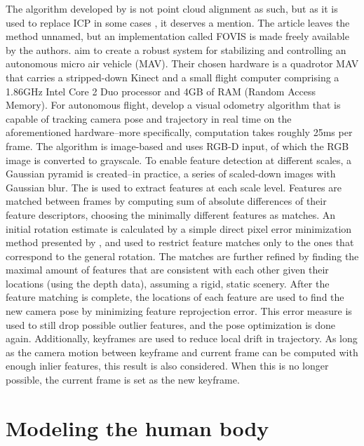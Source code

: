 The algorithm developed by \citet{huang2011visual} is not point cloud alignment as such, but as it is used to replace ICP in some cases \citep{Whelan12rssw}, it deserves a mention. The article leaves the method unnamed, but an implementation called FOVIS \citep{fovis} is made freely available by the authors. \citet{huang2011visual} aim to create a robust system for stabilizing and controlling an autonomous micro air vehicle (MAV). Their chosen hardware is a quadrotor MAV that carries a stripped-down Kinect and a small flight computer comprising a 1.86GHz Intel Core 2 Duo processor and 4GB of RAM (Random Access Memory). For autonomous flight, \citeauthor{huang2011visual} develop a visual odometry algorithm that is capable of tracking camera pose and trajectory in real time on the aforementioned hardware--more specifically, computation takes roughly 25ms per frame. The algorithm is image-based and uses RGB-D input, of which the RGB image is converted to grayscale. To enable feature detection at different scales, a Gaussian pyramid is created--in practice, a series of scaled-down images with Gaussian blur. The  is used to extract features at each scale level. Features are matched between frames by computing sum of absolute differences of their feature descriptors, choosing the minimally different features as matches. An initial rotation estimate is calculated by a simple direct pixel error minimization method presented by , and used to restrict feature matches only to the ones that correspond to the general rotation. The matches are further refined by finding the maximal amount of features that are consistent with each other given their locations (using the depth data), assuming a rigid, static scenery. After the feature matching is complete, the locations of each feature are used to find the new camera pose by minimizing feature reprojection error. This error measure is used to still drop possible outlier features, and the pose optimization is done again. Additionally, keyframes are used to reduce local drift in trajectory. As long as the camera motion between keyframe and current frame can be computed with enough inlier features, this result is also considered. When this is no longer possible, the current frame is set as the new keyframe. \citep{huang2011visual}


\section{Modeling the human body}

